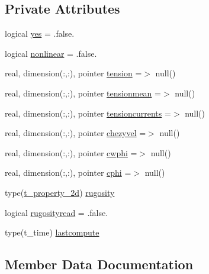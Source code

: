 \subsection*{Private Attributes}
\begin{DoxyCompactItemize}
\item 
logical \mbox{\hyperlink{structmoduleinterfacesedimentwater_1_1t__waveshear_a34200c104d86de4de8e12e5f7baae52a}{yes}} = .false.
\item 
logical \mbox{\hyperlink{structmoduleinterfacesedimentwater_1_1t__waveshear_adebc3e9a62332531f0a253ac8cd2ac32}{nonlinear}} = .false.
\item 
real, dimension(\+:,\+:), pointer \mbox{\hyperlink{structmoduleinterfacesedimentwater_1_1t__waveshear_a6f8e57f68bd80c38a876c07b886b5585}{tension}} =$>$ null()
\item 
real, dimension(\+:,\+:), pointer \mbox{\hyperlink{structmoduleinterfacesedimentwater_1_1t__waveshear_a736c28669be26685d85be58dde791703}{tensionmean}} =$>$ null()
\item 
real, dimension(\+:,\+:), pointer \mbox{\hyperlink{structmoduleinterfacesedimentwater_1_1t__waveshear_a6e21c506bc5d0efa24d89ee0bade73cc}{tensioncurrents}} =$>$ null()
\item 
real, dimension(\+:,\+:), pointer \mbox{\hyperlink{structmoduleinterfacesedimentwater_1_1t__waveshear_a22f69f5e07abbbf6282c9f9730d3cdb4}{chezyvel}} =$>$ null()
\item 
real, dimension(\+:,\+:), pointer \mbox{\hyperlink{structmoduleinterfacesedimentwater_1_1t__waveshear_ac8ce419c6bb0cc3a9ca351425cf96d68}{cwphi}} =$>$ null()
\item 
real, dimension(\+:,\+:), pointer \mbox{\hyperlink{structmoduleinterfacesedimentwater_1_1t__waveshear_a9a95390879d582c536976fe74aa5d948}{cphi}} =$>$ null()
\item 
type(\mbox{\hyperlink{structmoduleinterfacesedimentwater_1_1t__property__2d}{t\+\_\+property\+\_\+2d}}) \mbox{\hyperlink{structmoduleinterfacesedimentwater_1_1t__waveshear_aacfc22e3a151a86ced751b43304751fd}{rugosity}}
\item 
logical \mbox{\hyperlink{structmoduleinterfacesedimentwater_1_1t__waveshear_ab37076ed0463cfcd1cff52529813d7c5}{rugosityread}} = .false.
\item 
type(t\+\_\+time) \mbox{\hyperlink{structmoduleinterfacesedimentwater_1_1t__waveshear_acb4ed55073290dbc469b8611896e238e}{lastcompute}}
\end{DoxyCompactItemize}


\subsection{Member Data Documentation}
\mbox{\label{structmoduleinterfacesedimentwater_1_1t__waveshear_a22f69f5e07abbbf6282c9f9730d3cdb4}} 
